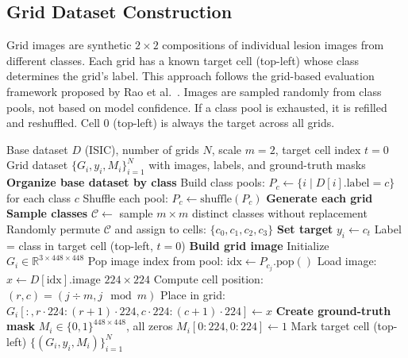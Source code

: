 \documentclass[11pt]{article}
\begin{document}
\subsection{Grid Dataset Construction}

Grid images are synthetic $2 \times 2$ compositions of individual lesion images from different classes. Each grid has a known target cell (top-left) whose class determines the grid's label. This approach follows the grid-based evaluation framework proposed by Rao et al.~\citep{rao2022understanding}. Images are sampled randomly from class pools, not based on model confidence. If a class pool is exhausted, it is refilled and reshuffled. Cell 0 (top-left) is always the target across all grids.

\begin{algorithm}[H]
\caption{Grid Dataset Generation}
\label{alg:grid_generation}
\begin{algorithmic}[1]
\REQUIRE Base dataset $D$ (ISIC), number of grids $N$, scale $m=2$, target cell index $t=0$
\ENSURE Grid dataset $\{G_i, y_i, M_i\}_{i=1}^N$ with images, labels, and ground-truth masks
\STATE \textbf{Organize base dataset by class}
\STATE Build class pools: $P_c \leftarrow \{i \mid D[i].\text{label} = c\}$ for each class $c$
\STATE Shuffle each pool: $P_c \leftarrow \text{shuffle}(P_c)$
\STATE \textbf{Generate each grid}
    \STATE \textbf{ Sample classes}
    \STATE $\mathcal{C} \leftarrow$ sample $m \times m$ distinct classes without replacement
    \STATE Randomly permute $\mathcal{C}$ and assign to cells: $\{c_0, c_1, c_2, c_3\}$
    \STATE \textbf{ Set target}
    \STATE $y_i \leftarrow c_t$ \quad  Label = class in target cell (top-left, $t=0$)
    \STATE \textbf{ Build grid image}
    \STATE Initialize $G_i \in \mathbb{R}^{3 \times 448 \times 448}$
        \STATE Pop image index from pool: $\text{idx} \leftarrow P_{c_j}.\text{pop}()$
        \STATE Load image: $x \leftarrow D[\text{idx}].\text{image}$ \quad  $224 \times 224$
        \STATE Compute cell position: $(r, c) = (j \div m, j \mod m)$
        \STATE Place in grid: $G_i[:, r \cdot 224:(r+1) \cdot 224, c \cdot 224:(c+1) \cdot 224] \leftarrow x$
    \ENDFOR
    \STATE \textbf{ Create ground-truth mask}
    \STATE $M_i \in \{0,1\}^{448 \times 448}$, all zeros
    \STATE $M_i[0:224, 0:224] \leftarrow 1$ \quad  Mark target cell (top-left)
\ENDFOR
\RETURN $\{(G_i, y_i, M_i)\}_{i=1}^N$
\end{algorithmic}
\end{algorithm}
\end{document}
